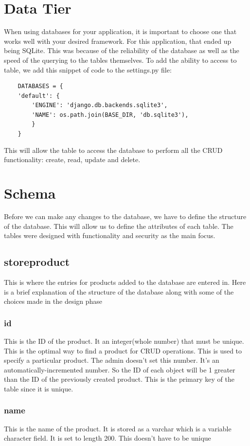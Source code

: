 \section{Data Tier}
When using databases for your application, it is important to choose one that works well with your desired framework. For this application, that ended up being SQLite. This was because of the reliability of the database as well as the speed of the querying to the tables themselves. To add the ability to access to table, we add this snippet of code to the settings.py file:
\begin{verbatim}
    DATABASES = {
    'default': {
        'ENGINE': 'django.db.backends.sqlite3',
        'NAME': os.path.join(BASE_DIR, 'db.sqlite3'),
        }
    }
\end{verbatim}
This will allow the table to access the database to perform all the CRUD functionality: create, read, update and delete. 
\section{Schema}
Before we can make any changes to the database, we have to define the structure of the database. This will allow us to define the attributes of each table. The tables were designed with functionality and security as the main focus. 
\subsection{store\textunderscore product}
This is where the entries for products added to the database are entered in. Here is a brief explanation of the structure of the database along with some of the choices made in the design phase
\subsubsection{id}
This is the ID of the product. It an integer(whole number) that must be unique. This is the optimal way to find a product for CRUD operations. This is used to specify a particular product. The admin doesn't set this number. It's an automatically-incremented number. So the ID of each object will be 1 greater than the ID of the previously created product. This is the primary key of the table since it is unique.
\subsubsection{name}
This is the name of the product. It is stored as a varchar which is a variable character field. It is set to length 200. This doesn't have to be unique

